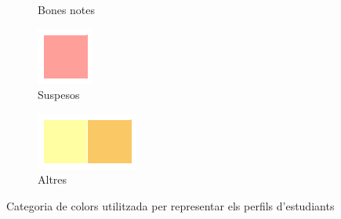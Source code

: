 \documentclass[12pt,a4paper,catalan]{article}
\begin{document}
\begin{figure}[h]
\begin{subfigure}{.2\textwidth}
  \caption{Bones notes}
\end{subfigure}
\begin{subfigure}{.2\textwidth}
  \centering
  \includegraphics[width=\linewidth]{img/suspesos.png}
  \caption{Suspesos}
\end{subfigure}
\begin{subfigure}{.2\textwidth}
  \centering
  \includegraphics[width=\linewidth]{img/altresperfils.png}
  \caption{Altres}
\end{subfigure}
\caption{Categoria de colors utilitzada per representar els perfils d'estudiants}
\end{figure}
\end{document}
